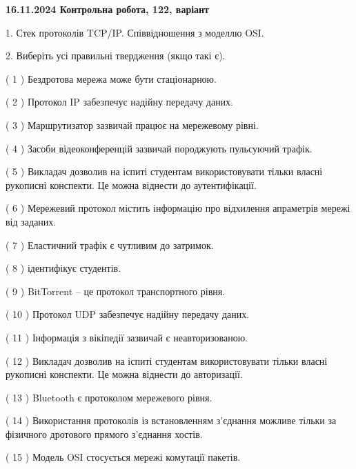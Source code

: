 \documentclass[12pt, ukrainian]{article}
\begin{document}
\vspace{4mm}
\newpage
\begin {large}

\textbf{16.11.2024 Контрольна робота, 122, варіант  }\par


{
1. Стек протоколів TCP/IP. Співвідношення з моделлю OSI.



\vspace{5mm}
2. Виберіть усі правильні твердження (якщо такі є).\par
\vspace{2mm}

( 1 ) Бездротова мережа може бути стаціонарною.

( 2 ) Протокол IP забезпечує надійну передачу даних.

( 3 ) Маршрутизатор зазвичай працює на мережевому рівні.

( 4 ) Засоби відеоконференцій зазвичай породжують пульсуючий трафік.

( 5 ) Викладач дозволив на іспиті студентам використовувати тільки власні рукописні конспекти. Це можна віднести до аутентифікації.

( 6 ) Мережевий протокол містить інформацію про відхилення апраметрів мережі від заданих.

( 7 ) Еластичний трафік є чутливим до затримок.

( 8 ) ідентифікує студентів.

( 9 ) BitTorrent – це протокол транспортного рівня.

( 10 ) Протокол UDP забезпечує надійну передачу даних.

( 11 ) Інформація з вікіпедії зазвичай є неавторизованою.

( 12 ) Викладач дозволив на іспиті студентам використовувати тільки власні рукописні конспекти. Це можна віднести до авторизації.

( 13 ) Bluetooth є протоколом мережевого рівня.

( 14 ) Використання протоколів із встановленням з'єднання можливе тільки за фізичного дротового прямого з'єднання хостів.

( 15 ) Модель OSI стосується мережі комутації пакетів.
}
\end {large}
\end{document}
